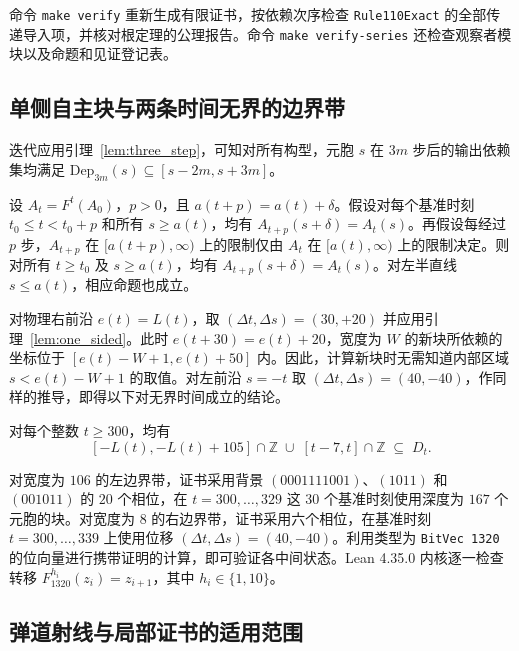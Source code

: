 命令 \texttt{make verify} 重新生成有限证书，按依赖次序检查 \texttt{Rule110Exact} 的全部传递导入项，并核对根定理的公理报告。命令 \texttt{make verify-series} 还检查观察者模块以及命题和见证登记表。

\subsection{单侧自主块与两条时间无界的边界带}\label{app:half-ray-tiles}

迭代应用引理~\ref{lem:three_step}，可知对所有构型，元胞 $s$ 在 $3m$ 步后的输出依赖集均满足 $\mathrm{Dep}_{3m}(s) \subseteq [s - 2m, s + 3m]$。

\begin{lemma}[半直线上的闭合性]\label{lem:one_sided}
设 $A_t = F^t(A_0)$，$p > 0$，且 $a(t + p) = a(t) + \delta$。假设对每个基准时刻 $t_0 \le t < t_0 + p$ 和所有 $s \ge a(t)$，均有 $A_{t+p}(s + \delta) = A_t(s)$。再假设每经过 $p$ 步，$A_{t+p}$ 在 $[a(t+p), \infty)$ 上的限制仅由 $A_t$ 在 $[a(t), \infty)$ 上的限制决定。则对所有 $t \ge t_0$ 及 $s \ge a(t)$，均有 $A_{t+p}(s + \delta) = A_t(s)$。对左半直线 $s \le a(t)$，相应命题也成立。
\end{lemma}

对物理右前沿 $e(t) = L(t)$，取 $(\Delta t, \Delta s) = (30, +20)$ 并应用引理~\ref{lem:one_sided}。此时 $e(t+30) = e(t) + 20$，宽度为 $W$ 的新块所依赖的坐标位于 $[e(t) - W + 1, e(t) + 50]$ 内。因此，计算新块时无需知道内部区域 $s < e(t) - W + 1$ 的取值。对左前沿 $s = -t$ 取 $(\Delta t, \Delta s) = (40,-40)$，作同样的推导，即得以下对无界时间成立的结论。

\begin{theorem}[两条边界带]\label{thm:dual_strips}
对每个整数 $t \ge 300$，均有
\begin{equation}\label{eq:dual_strips}
[-L(t), -L(t) + 105] \cap \mathbb{Z} \;\cup\; [t - 7, t] \cap \mathbb{Z} \;\subseteq\; D_t.
\end{equation}
\end{theorem}

对宽度为 $106$ 的左边界带，证书采用背景 $(0001111001)$、$(1011)$ 和 $(001011)$ 的 $20$ 个相位，在 $t = 300, \dots, 329$ 这 $30$ 个基准时刻使用深度为 $167$ 个元胞的块。对宽度为 $8$ 的右边界带，证书采用六个相位，在基准时刻 $t = 300, \dots, 339$ 上使用位移 $(\Delta t, \Delta s) = (40,-40)$。利用类型为 \texttt{BitVec 1320} 的位向量进行携带证明的计算，即可验证各中间状态。Lean 4.35.0 内核逐一检查转移 $F_{1320}^{h_i}(z_i) = z_{i+1}$，其中 $h_i \in \{1, 10\}$。

\subsection{弹道射线与局部证书的适用范围}

